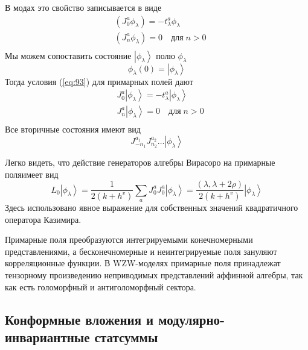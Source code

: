 \documentclass[a4paper,12pt]{article}
\theoremstyle{definition} \newtheorem{Def}{Definition}
\begin{document}
В модах это свойство записывается в виде
\begin{equation}
  \label{eq:93}
  \begin{aligned}
    & (J_0^a \phi_{\lambda})=-t^a_{\lambda}\phi_{\lambda}\\
    & (J^a_n\phi_{\lambda})=0\quad \mbox{для}\; n>0\\
  \end{aligned}
\end{equation}
Мы можем сопоставить состояние $\left|\phi_{\lambda}\right>$ полю $\phi_{\lambda}$
  \begin{equation}
    \label{eq:94}
    \phi_{\lambda}(0)=\left|\phi_{\lambda}\right>
  \end{equation}
Тогда условия (\ref{eq:93}) для примарных полей дают
\begin{equation}
  \label{eq:95}
  \begin{aligned}
    & J_0^a\left|\phi_{\lambda}\right>=-t^a_{\lambda}\left|\phi_{\lambda}\right>\\
    & J^a_n\left|\phi_{\lambda}\right>=0 \quad \mbox{для}\; n>0 \\
  \end{aligned}
\end{equation}
Все вторичные состояния имеют вид
\begin{equation}
  \label{eq:97}
  J^{a_1}_{-n_1}J^{a_2}_{n_2}\dots\left|\phi_{\lambda}\right>
\end{equation}

Легко видеть, что действие генераторов алгебры Вирасоро на примарные поляимеет вид
\begin{equation}
  \label{eq:96}
  L_0\left|\phi_{\lambda}\right>=\frac{1}{2(k+h^v)}\sum_aJ^a_0J^a_0\left|\phi_{\lambda}\right>=\frac{(\lambda,\lambda+2\rho)}{2(k+h^v)}\left|\phi_{\lambda}\right>
\end{equation}
Здесь использовано явное выражение для собственных значений квадратичного оператора Казимира.

Примарные поля преобразуются  интегрируемыми конечномерными представлениями, а бесконечномерные и
неинтегрируемые поля зануляют корреляционные функции.
В WZW-моделях примарные поля
принадлежат тензорному произведению неприводимых представлений аффинной алгебры, так как есть
голоморфный и антиголоморфный сектора.


\subsection{Конформные вложения и модулярно-инвариантные статсуммы}
\label{sec:modular-invariance}
\end{document}
